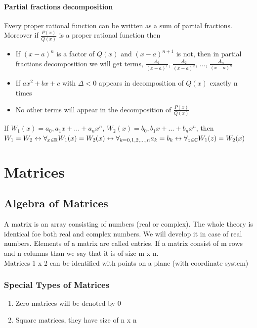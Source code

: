 \documentclass{report}
\begin{document}
\subsubsection{Partial fractions decomposition}
Every proper rational function can be written as a sum of partial fractions. Moreover if $\frac{P(x)}{Q(x)}$ is a proper rational function then
\begin{itemize}
	\item If $(x-a)^n$ is a factor of $Q(x)$ and $(x-a)^{n+1}$ is not, then in partial fractions decomposition we will get terms, $\frac{A_1}{(x-a)^1}$, $\frac{A_2}{(x-a)^2}$, ..., $\frac{A_n}{(x-a)^n}$
	\item If $ax^2 + bx + c$ with $\Delta < 0$ appears in decomposition of $Q(x)$ exactly n times
	\item No other terms will appear in the decomposition of $\frac{P(x)}{Q(x)}$
\end{itemize}
\LARGE
If $W_1(x) = a_0, a_1x + ... + a_nx^n$, $W_2(x) = b_0, b_1x + ... + b_nx^n$, then $W_1 = W_2 \leftrightarrow \\ \forall_{x\in\mathbb{R}} W_1(x) = W_2(x) \leftrightarrow \\ \forall_{k=0, 1, 2, ... , n} a_k = b_k \leftrightarrow \\ \forall_{z\in\mathbb{C}} W_1(z) = W_2(x)$
\large



\chapter{Matrices}

\section{Algebra of Matrices}
A matrix is an array consisting of numbers (real or complex). The whole theory is identical foe both real and complex numbers. We will develop it in case of real numbers. Elements of a matrix are called entries. If a matrix consist of m rows and n columns than we say that it is of size m x n. \\
Matrices 1 x 2 can be identified with points on a plane (with coordinate system)

\subsection{Special Types of Matrices}
\begin{enumerate}
	\item Zero matrices will be denoted by 0
	\item Square matrices, they have size of n x n
\end{enumerate}
\end{document}
